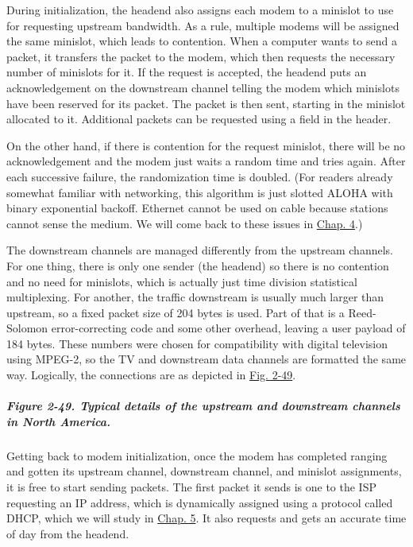 \documentclass[b5paper,11pt]{memoir}
\begin{document}
During initialization, the headend also assigns each modem to a minislot
to use for requesting upstream bandwidth. As a rule, multiple modems
will be assigned the same minislot, which leads to contention. When a
computer wants to send a packet, it transfers the packet to the modem,
which then requests the necessary number of minislots for it. If the
request is accepted, the headend puts an acknowledgement on the
downstream channel telling the modem which minislots have been reserved
for its packet. The packet is then sent, starting in the minislot
allocated to it. Additional packets can be requested using a field in
the header.

On the other hand, if there is contention for the request minislot,
there will be no acknowledgement and the modem just waits a random time
and tries again. After each successive failure, the randomization time
is doubled. (For readers already somewhat familiar with networking, this
algorithm is just slotted ALOHA with binary exponential backoff.
Ethernet cannot be used on cable because stations cannot sense the
medium. We will come back to these issues in
\protect\hyperlink{0130661023_ch04.htmlux5cux23ch04}{Chap. 4}.)

The downstream channels are managed differently from the upstream
channels. For one thing, there is only one sender (the headend) so there
is no contention and no need for minislots, which is actually just time
division statistical multiplexing. For another, the traffic downstream
is usually much larger than upstream, so a fixed packet size of 204
bytes is used. Part of that is a Reed-Solomon error-correcting code and
some other overhead, leaving a user payload of 184 bytes. These numbers
were chosen for compatibility with digital television using MPEG-2, so
the TV and downstream data channels are formatted the same way.
Logically, the connections are as depicted in
\protect\hyperlink{0130661023_ch02lev1sec7.htmlux5cux23ch02fig49}{Fig.
2-49}.

\subparagraph[Figure 2-49. Typical details of the upstream and
downstream channels in North
America.]{\texorpdfstring{\protect\hypertarget{0130661023_ch02lev1sec7.htmlux5cux23ch02fig49}{}{}Figure
2-49. Typical details of the upstream and downstream channels in North
America.}{Figure 2-49. Typical details of the upstream and downstream channels in North America.}}


Getting back to modem initialization, once the modem has completed
ranging and gotten its upstream channel, downstream channel, and
minislot assignments, it is free to start sending packets. The first
packet it sends is one to the ISP requesting an IP address, which is
dynamically assigned using a protocol called DHCP, which we will study
in \protect\hyperlink{0130661023_ch05.htmlux5cux23ch05}{Chap. 5}. It
also requests and gets an accurate time of day from the headend.
\end{document}
